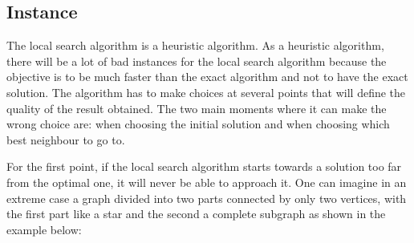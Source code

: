 
\subsection{Instance}

The local search algorithm is a heuristic algorithm. As a heuristic algorithm, there will 
be a lot of bad instances for the local search algorithm because the objective is to be 
much faster than the exact algorithm and not to have the exact solution. The algorithm has 
to make choices at several points that will define the quality of the result obtained. The 
two main moments where it can make the wrong choice are: when choosing the initial solution 
and when choosing which best neighbour to go to.
\bigskip

For the first point, if the local search algorithm starts towards a solution too far 
from the optimal one, it will never be able to approach it. One can imagine in an extreme 
case a graph divided into two parts connected by only two vertices, with the first part like 
a star and the second a complete subgraph as shown in the example below:

